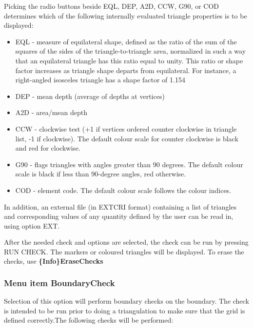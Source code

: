 \documentclass{article}
\begin{document}
Picking the radio buttons beside EQL, DEP, A2D, CCW, G90, or COD determines which of the following internally evaluated triangle properties is to be displayed:

\begin{itemize}
\item EQL - measure of equilateral shape, defined as the ratio of the sum of the squares of the sides of the triangle-to-triangle area, normalized in such a way that an equilateral triangle has this ratio equal to unity. This ratio or shape factor increases as triangle shape departs from equilateral. For instance, a right-angled isosceles triangle has a shape factor of 1.154
\item DEP - mean depth (average of depths at vertices)
\item A2D - area/mean depth
\item CCW - clockwise test (+1 if vertices ordered counter clockwise in triangle list, -1 if clockwise). The default colour scale for counter clockwise is black and red for clockwise.
\item G90 - flags triangles with angles greater than 90 degrees. The default colour scale is black if less than 90-degree angles, red otherwise.
\item COD - element code. The default colour scale follows the colour indices.
\end{itemize}
In addition, an external file (in EXTCRI format) containing a list of triangles and corresponding values of any quantity defined by the user can be read in, using option EXT.

After the needed check and options are selected, the check can be run by pressing RUN CHECK. The markers or coloured triangles will be displayed. To erase the checks, use \textbf{\{Info\}EraseChecks}

\subsubsection{Menu item BoundaryCheck}
Selection of this option will perform boundary checks on the boundary. The check is intended to be run prior to doing a triangulation to make sure that the grid is defined correctly.The following checks will be performed:
\end{document}
